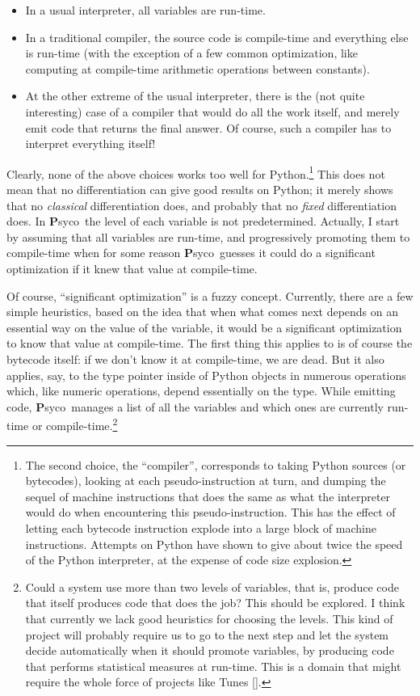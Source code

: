 \documentclass{article}
\def\Psyco{{\bf P}syco}
\begin{document}
\begin{itemize}
  \item In a usual interpreter, all variables are run-time.
  \item In a traditional compiler, the source code is compile-time and everything else is run-time (with the exception of a few common optimization, like computing at compile-time arithmetic operations between constants).
  \item At the other extreme of the usual interpreter, there is the (not quite interesting) case of a compiler that would do all the work itself, and merely emit code that returns the final answer. Of course, such a compiler has to interpret everything itself!
\end{itemize}

Clearly, none of the above choices works too well for Python.\footnote{The second choice, the ``compiler'', corresponds to taking Python sources (or bytecodes), looking at each pseudo-instruction at turn, and dumping the sequel of machine instructions that does the same as what the interpreter would do when encountering this pseudo-instruction. This has the effect of letting each bytecode instruction explode into a large block of machine instructions. Attempts on Python have shown to give about twice the speed of the Python interpreter, at the expense of code size explosion.}
This does not mean that no differentiation can give good results on Python; it merely shows that no \emph{classical} differentiation does, and probably that no \emph{fixed} differentiation does. In \Psyco\ the level of each variable is not predetermined. Actually, I start by assuming that all variables are run-time, and progressively promoting them to compile-time when for some reason \Psyco\ guesses it could do a significant optimization if it knew that value at compile-time.

Of course, ``significant optimization'' is a fuzzy concept. Currently, there are a few simple heuristics, based on the idea that when what comes next depends on an essential way on the value of the variable, it would be a significant optimization to know that value at compile-time. The first thing this applies to is of course the bytecode itself: if we don't know it at compile-time, we are dead. But it also applies, say, to the type pointer inside of Python objects in numerous operations which, like numeric operations, depend essentially on the type. While emitting code, \Psyco\ manages a list of all the variables and which ones are currently run-time or compile-time.\footnote{Could a system use more than two levels of variables, that is, produce code that itself produces code that does the job? This should be explored. I think that currently we lack good heuristics for choosing the levels. This kind of project will probably require us to go to the next step and let the system decide automatically when it should promote variables, by producing code that performs statistical measures at run-time. This is a domain that might require the whole force of projects like Tunes [].}
\end{document}
